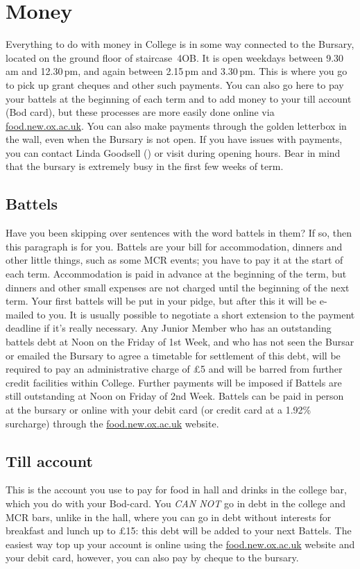 
\chapter{Money}

Everything to do with money in College is in some way connected to the Bursary,
located on the ground floor of staircase~4OB. It is open weekdays between
9.30\,am and 12.30\,pm, and again between 2.15\,pm and 3.30\,pm. This is where you go to pick up grant cheques and other such payments. You can also go here to pay your battels at the beginning of each term and to add money to your till account (Bod card), but these processes are more easily done online via \url{food.new.ox.ac.uk}. You can also make payments through the golden letterbox in the wall, even when the Bursary is not open. If you have issues with payments, you can contact Linda Goodsell (\href{mailto:linda.goodsell@new.ox.ac.uk}{}) or visit during opening hours. Bear in mind that the bursary is extremely busy in the first few weeks of term.

\section{Battels}
Have you been skipping over sentences with the word battels in them? If so, then
this paragraph is for you. Battels are your bill for accommodation, dinners and
other little things, such as some MCR events; you have to pay it at the start of each term. Accommodation is paid in advance at the beginning of the term, but dinners and other small expenses are not charged until the beginning of the next term. Your first battels will be put in your pidge, but after this it will be e-mailed to you. It is usually possible to negotiate a short extension to the payment deadline if it's really necessary. Any Junior Member who has an outstanding battels debt at Noon on the Friday of 1st Week,  and  who  has  not  seen  the  Bursar  or  emailed the  Bursary  to  agree  a timetable  for  settlement  of  this  debt,  will  be  required  to  pay  an  administrative charge of £5 and will be barred from further credit facilities within College.  Further payments will be imposed if Battels are still outstanding at Noon on Friday of 2nd Week. Battels can be paid in person at the bursary or online with your debit card (or credit card at a 1.92\% surcharge) through the \url{food.new.ox.ac.uk} website.
\section{Till account}
This is the account you use to pay for food in hall and drinks in the college
bar, which you do with your Bod-card. You \emph{CAN NOT} go in debt in the
college and MCR bars, unlike in the hall, where you can go in debt without
interests for breakfast and lunch up to \pounds15: this debt will be added to your next Battels. The easiest way top up
your account is online using the \url{food.new.ox.ac.uk} website and your debit card, however, you can also pay by cheque to the bursary.

